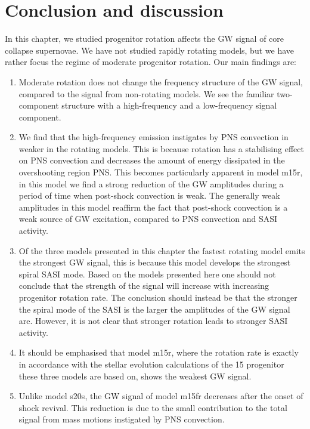 \section{Conclusion and discussion}
In this chapter, we studied progenitor rotation affects the GW signal of core collapse supernovae.
We have not studied rapidly rotating models, but we have rather focus the regime of moderate progenitor rotation.
Our main findings are:
\begin{enumerate}
\item Moderate rotation does not change the frequency structure of the GW signal, compared to the signal from non-rotating models.
We see the familiar two-component structure with a high-frequency and a low-frequency signal component.
\item We find that the high-frequency emission instigates by PNS convection in weaker in the rotating models. This is because rotation has a stabilising effect on PNS convection and decreases the amount of energy dissipated in the overshooting region PNS.
This becomes particularly apparent in model m15r, in this model we find a strong reduction of the GW amplitudes during a 
period of time when post-shock convection is weak. The generally weak amplitudes in this model reaffirm the fact that post-shock convection is a weak source of GW excitation, compared to PNS convection and SASI activity.
\item Of the three models presented in this chapter the fastest rotating model emits the strongest GW signal, this is
because this model develops the strongest spiral SASI mode. Based on the models presented here one should not conclude
that the strength of the signal will increase with increasing progenitor rotation rate. The conclusion should instead be
that the stronger the spiral mode of the SASI is the larger the amplitudes of the GW signal are. However, it is not clear
that stronger rotation leads to stronger SASI activity.
\item It should be emphasised that model m15r, where the rotation rate is exactly in accordance with the stellar evolution
calculations of the 15 \msun progenitor these three models are based on, shows the weakest GW signal.  
\item Unlike model s20s, the GW signal of model m15fr decreases after the onset of shock revival. This reduction is due to
the small contribution to the total signal from mass motions instigated by PNS convection.
\end{enumerate}

